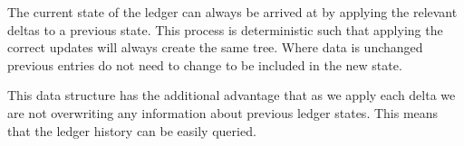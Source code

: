 The current state of the ledger can always be arrived at by applying the relevant deltas to a previous state. This process is deterministic such that applying the correct updates will always create the same tree. Where data is unchanged previous entries do not need to change to be included in the new state.

This data structure has the additional advantage that as we apply each delta we are not overwriting any information about previous ledger states. This means that the ledger history can be easily queried.

